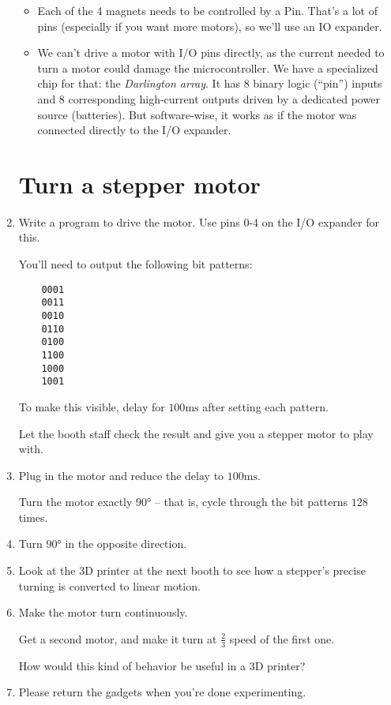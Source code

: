 \documentclass{../tutorial}
\begin{document}
\begin{enumerate}
\begin{itemize}
    \item
    Each of the 4 magnets needs to be controlled by a Pin.
    That's a lot of pins (especially if you want more motors),
    so we'll use an IO expander.

    \item
    We can't drive a motor with I/O pins directly, as
    the current needed to turn a motor could damage the microcontroller.
    We have a specialized chip for that: the 
    \emph{Darlington array}.
    It has 8 binary logic (“pin”) inputs and 8 corresponding high-current
    outputs driven by a dedicated power source (batteries).
    But software-wise, it works as if the motor was connected directly to
    the I/O expander.
    \end{itemize}

\section{Turn a stepper motor}

\item
    Write a program to drive the motor.
    Use pins 0-4 on the I/O expander for this.

    You'll need to output the following bit patterns:

    \begin{lstlisting}
    0001
    0011
    0010
    0110
    0100
    1100
    1000
    1001
    \end{lstlisting}

    To make this visible, delay for $100 \si{\milli\second}$ after setting each
    pattern.

    Let the booth staff check the result and give you a stepper motor
    to play with.

\item
    Plug in the motor and reduce the delay to $100 \si{\milli\second}$.

    Turn the motor exactly $90 \si{\degree}$ – that is, cycle through the bit
    patterns $128$ times.

\item
    Turn $90 \si{\degree}$ in the opposite direction.

\item
    Look at the 3D printer at the next booth to see how a stepper's precise
    turning is converted to linear motion.

\item
    Make the motor turn continuously.

    Get a second motor, and make it turn at $\frac23$ speed of the first one.

    How would this kind of behavior be useful in a 3D printer?

\item
     Please return the gadgets when you're done experimenting.

\end{enumerate}
\end{document}
